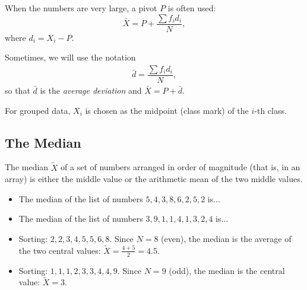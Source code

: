 When the numbers are very large, a pivot $P$ is often used: 
$$
\bar{X}=P+\dfrac{\sum f_{i}d_{i}}{N},
$$
where $d_{i}=X_{i}-P.$

Sometimes, we will use the notation
\begin{align}
	\bar{d}=\dfrac{\sum f_{i}d_{i}}{N},
\end{align}
so that $\bar{d}$ is the \emph{average deviation} and $\bar{X}=P+\bar{d}.$



\begin{remark}
	
	For grouped data, $X_{i}$ is chosen as the midpoint (class mark) of the $i$-th class.
\end{remark}


\subsection{The Median}
The median $\tilde{X}$ of a set of numbers arranged in order of magnitude (that is, in an array) is either the middle value or the arithmetic mean of the two middle values.


\begin{example}
	\begin{itemize}
		\item The median of the list of numbers $5, 4, 3, 8, 6, 2, 5, 2$ is... 
		\item The median of the list of numbers $3, 9, 1, 1, 4, 1, 3, 2, 4$ is...
	\end{itemize}	
\end{example}

\begin{solution}
	\begin{itemize}
		\item Sorting: $2, 2, 3, 4, 5, 5, 6, 8$. Since $N=8$ (even), the median is the average of the two central values: $\tilde{X} = \frac{4+5}{2} = 4.5$.
		\item Sorting: $1, 1, 1, 2, 3, 3, 4, 4, 9$. Since $N=9$ (odd), the median is the central value: $\tilde{X} = 3$.
	\end{itemize}
\end{solution}





